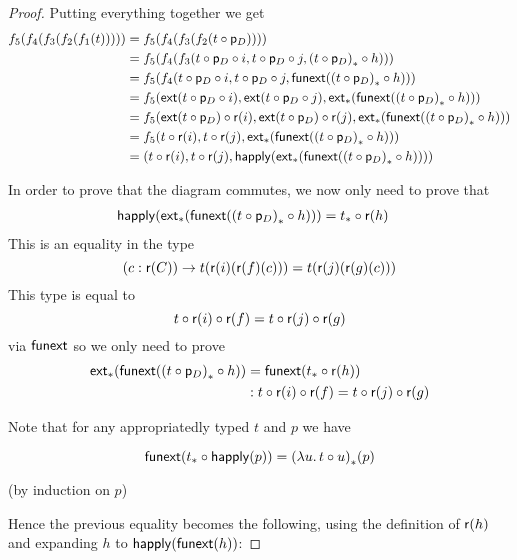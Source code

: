 \begin{proof}
  Putting everything together we get
  \begin{align*}
    f_5(f_4(f_3(f_2(f_1(t))))) &= f_5(f_4(f_3(f_2(t\circ\mathsf{p}_D)))) \\
    &= f_5(f_4(f_3(t\circ\mathsf{p}_D\circ{}i,t\circ\mathsf{p}_D\circ{}j,
    {(t\circ\mathsf{p}_D)}_{*}\circ{}h))) \\
    &=f_5(f_4(t\circ\mathsf{p}_D\circ{}i,t\circ\mathsf{p}_D\circ{}j,
    \mathsf{funext}({(t\circ\mathsf{p}_D)}_{*}\circ{}h))) \\
    &=f_5(\mathsf{ext}(t\circ\mathsf{p}_D\circ{}i),\mathsf{ext}(t\circ\mathsf{p}_D\circ{}j),
    {\mathsf{ext}}_{*}(\mathsf{funext}({(t\circ\mathsf{p}_D)}_{*}\circ{}h))) \\
    &=f_5(\mathsf{ext}(t\circ\mathsf{p}_D)\circ\mathsf{r}(i),
    \mathsf{ext}(t\circ\mathsf{p}_D)\circ\mathsf{r}(j),
    {\mathsf{ext}}_{*}(\mathsf{funext}({(t\circ\mathsf{p}_D)}_{*}\circ{}h))) \\
    &=f_5(t\circ\mathsf{r}(i),
    t\circ\mathsf{r}(j),
    {\mathsf{ext}}_{*}(\mathsf{funext}({(t\circ\mathsf{p}_D)}_{*}\circ{}h))) \\
    &=(t\circ\mathsf{r}(i),t\circ\mathsf{r}(j),
    \mathsf{happly}({\mathsf{ext}}_{*}(\mathsf{funext}({(t\circ\mathsf{p}_D)}_{*}\circ{}h))))
  \end{align*}

  In order to prove that the diagram commutes, we now only need to prove that
  \begin{align*}
    \mathsf{happly}({\mathsf{ext}}_{*}(\mathsf{funext}({(t\circ\mathsf{p}_D)}_{*}\circ{}h))) &=
    {t}_{*}\circ\mathsf{r}(h)
  \end{align*}
  This is an equality in the type
  \[(c:\mathsf{r}(C))\to{}t(\mathsf{r}(i)(\mathsf{r}(f)(c)))=
  t(\mathsf{r}(j)(\mathsf{r}(g)(c)))\]
  This type is equal to
  \[t\circ\mathsf{r}(i)\circ\mathsf{r}(f) = t\circ\mathsf{r}(j)\circ\mathsf{r}(g)\]
  via $\mathsf{funext}$ so we only need to prove
  \begin{align*}
    {\mathsf{ext}}_{*}(\mathsf{funext}({(t\circ\mathsf{p}_D)}_{*}\circ{}h)) &=
    \mathsf{funext}({t}_{*}\circ\mathsf{r}(h)) \\
    &: t\circ\mathsf{r}(i)\circ\mathsf{r}(f) =
    t\circ\mathsf{r}(j)\circ\mathsf{r}(g)
  \end{align*}

  Note that for any appropriatedly typed $t$ and $p$ we have

  \[\mathsf{funext}({t}_{*}\circ\mathsf{happly}(p))={(\lambda{}u.\,t\circ{}u)}_{*}\!\left({p}\right)\]

  (by induction on $p$)

  Hence the previous equality becomes the following, using the definition of
  $\mathsf{r}(h)$ and expanding $h$ to $\mathsf{happly}(\mathsf{funext}(h))$:


\end{proof}
